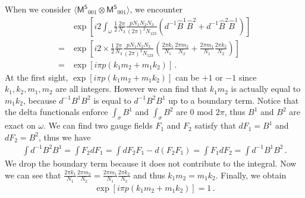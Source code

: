 \documentclass[11pt,nofootinbib,preprint]{revtex4-1}
\begin{document}
When we consider $\langle \mathsf{M^S}_{001}\otimes \mathsf{M^S}_{001} \rangle $, we encounter 
\begin{align}
	&\exp \left[ i2\int_{\omega}{\frac{1}{2}\frac{2\pi}{N_3}\frac{pN_1N_2N_3}{\left( 2\pi \right) ^2N_{123}}\left( d^{-1}\hat{B}^1\hat{B}^2+d^{-1}\hat{B}^2\hat{B}^1 \right)} \right] \nonumber
	\\
	=&\exp \left[ i2\times\frac{1}{2}\frac{2\pi}{N_3}\frac{pN_1N_2N_3}{\left( 2\pi \right) ^2N_{123}}\left( \frac{2\pi k_1}{N_1}\frac{2\pi m_2}{N_2}+\frac{2\pi m_1}{N_1}\frac{2\pi k_2}{N_2} \right) \right] \nonumber
	\\
	=&\exp \left[ i\pi p\left( k_1m_2+m_1k_2 \right) \right] \,.
\end{align}
At the first sight, $\exp \left[ i\pi p\left( k_1m_2+m_1k_2 \right) \right]$ can be $+1$ or $-1$ since $k_1,k_2,m_1,m_2$ are all integers. However we can find that $k_1m_2$ is actually equal to $m_1k_2$, because $d^{-1}B^1B^2$ is equal to $d^{-1}B^2B^1$ up to a boundary term. Notice that the delta functionals enforce $\int_{\sigma}{B^1}$ and $\int_{\sigma}{B^2}$ are $0$ mod $2\pi$, thus $B^1$ and $B^2$ are exact on $\omega$. We can find two gauge fields $F_1$ and $F_2$ satisfy that $dF_1=B^1$ and $dF_2=B^2$, thus we have
\begin{align}
	\int{d^{-1}B^2B^1}=\int{F_2dF_1}=\int{dF_2F_1-d\left( F_2F_1 \right)}=\int{F_1dF_2}=\int{d^{-1}B^1B^2}\,.
\end{align}
We drop the boundary term because it does not contribute to the integral. Now we can see that $\frac{2\pi k_1}{N_1}\frac{2\pi m_2}{N_2}=\frac{2\pi m_1}{N_1}\frac{2\pi k_2}{N_2}$ and thus $k_1m_2=m_1k_2$. Finally, we obtain 
\begin{align}
	\exp \left[ i\pi p\left( k_1m_2+m_1k_2 \right) \right] =1\,.
\end{align}
\end{document}
